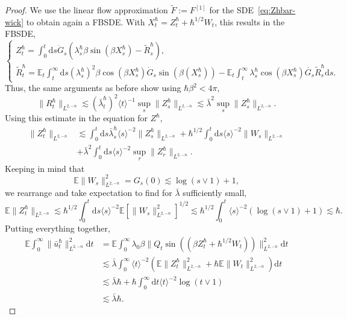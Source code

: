 \documentclass[11pt, a4paper]{scrartcl}
\numberwithin{equation}{section}
\theoremstyle{plain}
\theoremstyle{remark}
\newcommand{\assign}{:=}
\newcommand{\mathd}{\mathrm{d}}
\begin{document}
\begin{proof}
	We use the linear flow approximation $\tilde{F} \assign F^{[1]}$ for the
	SDE~\eqref{eq:Zhbar-wick} to obtain again a FBSDE. With $X^{\hbar}_t =
		Z_t^{\hbar} + \hbar^{1 / 2} W_t$, this results in the FBSDE,
	\[ \begin{cases}
			Z^{\hbar}_t = \int_0^t \mathd s \dot{G}_s (\lambda_s^{\hbar} \beta \sin
			(\beta X^{\hbar}_s) - \tilde{R}_s^{\hbar}), \\
			\tilde{R}_t^{\hbar} =\mathbb{E}_t  \int_t^{\infty} \mathd s
			(\lambda_s^{\hbar})^2 \beta \cos (\beta X^{\hbar}_s)  \dot{G}_s \sin
			\left( \beta (X^{\hbar}_s) \right) -\mathbb{E}_t  \int_t^{\infty}
			\lambda_s^{\hbar} \cos (\beta X^{\hbar}_s) \dot{G_s}
			\tilde{R}^{\hbar}_s \mathd s.
		\end{cases} \]
	Thus, the same arguments as before show using $\hbar \beta^2 < 4 \pi$,
	\[ \| R^{\hbar}_t \|_{L^{2, - n}} \lesssim (\bar{\lambda}^{\hbar}_t)^2 \langle t
		\rangle^{- 1} \sup_s \| Z^{\hbar}_s \|_{L^{2, - n}} \lesssim \bar{\lambda}^2
		\sup_s \| Z^{\hbar}_s \|_{L^{2, - n}} . \]
	Using this estimate in the equation for $Z^{\hbar}$,
	\begin{align*}
		\| Z^{\hbar}_t \|_{L^{2, - n}}
		 & \lesssim \int_0^t \mathd s
		\bar{\lambda}_s^{\hbar} \langle s \rangle^{- 2} \| Z^{\hbar}_s \|_{L^{2, - n}}
		+ \hbar^{1 / 2} \int_0^t \mathd s \langle s \rangle^{- 2}  \| W_s
		\|_{L^{2, - n}}               \\ &+ \bar{\lambda}^2  \int_0^t \mathd s \langle s \rangle^{- 2}
		\sup_r \| Z^{\hbar}_r \|_{L^{2, - n}} .
	\end{align*}
	Keeping in mind that
	\[ \mathbb{E} \| W_s \|^2_{L^{2, - n}} = G_s (0) \lesssim \log (s \vee 1) +
		1, \]
	we rearrange and take expectation to find for $\bar{\lambda}$ sufficiently small,
	\[ \mathbb{E} \| Z^{\hbar}_t \|_{L^{2, - n}} \lesssim \hbar^{1 / 2}
		\int_0^t \mathd s \langle s \rangle^{- 2} \mathbb{E} [\| W_s \|^2_{L^{2,
							- n}}]^{1 / 2} \lesssim \hbar^{1 / 2} \int_0^t \langle s \rangle^{- 2}
		(\log (s \vee 1) + 1) \lesssim \hbar . \]
	Putting everything together,
	\[ \begin{aligned}
			\mathbb{E} \int_0^{\infty} \| \bar{u}^{\hbar}_t \|^2_{L^{2, - n}}
			\mathd t & = \mathbb{E} \int_0^{\infty} \lambda_0 \beta \| Q_t \sin
			((\beta Z_t^{\hbar} + \hbar^{1 / 2} W_t)) \|_{L^{2, - n}}^2 \mathd t                \\
			         & \lesssim  \bar{\lambda} \int_0^{\infty} \langle t \rangle^{- 2}
			(\mathbb{E} \| Z^{\hbar}_t \|^2_{L^{2, - n}} + \hbar \mathbb{E} \| W_t
			\|^2_{L^{2, - n}}) \mathd t                                                         \\
			         & \lesssim  \bar{\lambda} \hbar + \hbar \int_0^{\infty} \mathd t \langle t
			\rangle^{- 2} \log (t \vee 1)                                                       \\
			         & \lesssim  \bar{\lambda} \hbar .
		\end{aligned} \]

\end{proof}
\end{document}
